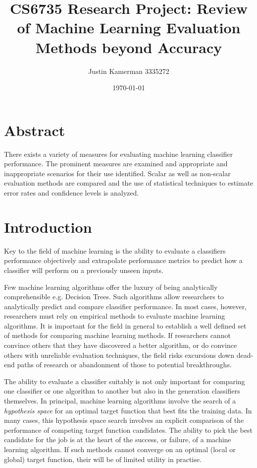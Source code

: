 \documentclass[10pt]{unbthesis}
\title{CS6735 Research Project: Review of Machine Learning Evaluation
  Methods beyond Accuracy}
\author{Justin Kamerman 3335272}
\date{\today}
\begin{document}
\maketitle
\renewcommand*\thesection{\arabic{section}}

\section*{Abstract}
There exists a variety of measures for evaluating machine
learning classifier performance. The prominent measures are examined
and appropriate and inappropriate scenarios for their use
identified. Scalar as well as non-scalar evaluation methods are
compared and the use of statistical techniques to estimate error rates
and confidence levels is analyzed.

\section{Introduction}
Key to the field of machine learning is the ability to evaluate a
classifiers performance objectively and extrapolate performance
metrics to predict how a classifier will perform on a previously
unseen inputs. 

Few machine learning algorithms offer the luxury of being analytically
comprehensible e.g. Decision Trees. Such algorithms
allow researchers to analytically predict and compare classifier
performance. In most cases, however, researchers must rely on
empirical methods to evaluate machine learning algorithms. It is
important for the field in general to establish a well defined set of
methods for comparing machine learning methods. If researchers cannot
convince others that they have discovered a better algorithm, or do
convince others with unreliable evaluation techniques, the field risks
excursions down dead-end paths of research or abandonment of those to
potential breakthroughs. 

The ability to evaluate a classifier suitably is not
only important for comparing one classifier or one algorithm to
another but also in the generation classifiers themselves. In
principal, machine learning algorithms involve the search of a
\textit{hypothesis space} for an optimal target function that best
fits the training data. In many cases, this hypothesis space search
involves an explicit comparison of the performance of competing target
function candidates. The ability to pick the best candidate for the
job is at the heart of the success, or failure, of a machine learning
algorithm. If such methods cannot converge on an optimal (local or
global) target function, their will be of limited utility in
practise.
\end{document}
